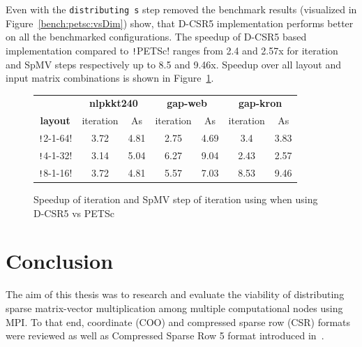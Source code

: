\documentclass[thesis=M,english]{FITthesis}[2019/12/23]
\newcommand{\csre}[1]{\texttt!#1!}
\begin{document}
Even with the \texttt{distributing s} step removed the benchmark results (visualized in
Figure~\ref{bench:petsc:vsDim}) show, that D-CSR5 implementation performs better
on all the benchmarked configurations. The speedup of D-CSR5 based implementation compared to \csre{PETSc}
ranges from 2.4 and 2.57x for iteration and SpMV steps respectively up to 8.5 and 9.46x. Speedup over all layout
and input matrix combinations is shown in Figure~\ref{bench:petsc:table}.


\begin{figure}[htp]
    \centering
    \begin{tabular}{*{7}{c}}
        \toprule
                        & \multicolumn{2}{c}{\textbf{nlpkkt240}} & \multicolumn{2}{c}{\textbf{gap-web}} & \multicolumn{2}{c}{\textbf{gap-kron}}                           \\
        \cmidrule(lr){2-3} \cmidrule(lr){4-5} \cmidrule(lr){6-7}
        \textbf{layout} & iteration                              & As                                   & iteration                             & As   & iteration & As   \\
        \midrule
        \csre{2-1-64}   & 3.72                                   & 4.81                                 & 2.75                                  & 4.69 & 3.4       & 3.83 \\
        \csre{4-1-32}   & 3.14                                   & 5.04                                 & 6.27                                  & 9.04 & 2.43      & 2.57 \\
        \csre{8-1-16}   & 3.72                                   & 4.81                                 & 5.57                                  & 7.03 & 8.53      & 9.46 \\
        \bottomrule
    \end{tabular}
    \caption{Speedup of iteration and SpMV step of iteration using when using D-CSR5 vs PETSc}\label{bench:petsc:table}
\end{figure}


\chapter{Conclusion}

The aim of this thesis was to research and evaluate the viability of distributing sparse matrix-vector multiplication
among multiple computational nodes using MPI\@. To that end, coordinate (COO) and compressed sparse row (CSR) formats
were reviewed as well as Compressed Sparse Row 5 format introduced in~\cite{liu2015csr5}.
\end{document}
